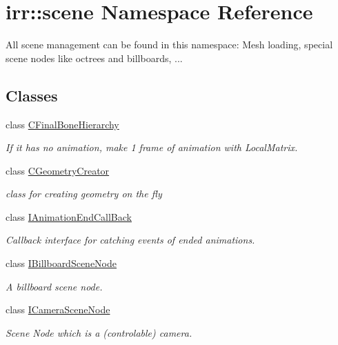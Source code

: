 \hypertarget{namespaceirr_1_1scene}{}\section{irr\+:\+:scene Namespace Reference}
\label{namespaceirr_1_1scene}


All scene management can be found in this namespace\+: Mesh loading, special scene nodes like octrees and billboards, ...  


\subsection*{Classes}
\begin{DoxyCompactItemize}
\item 
class \hyperlink{classirr_1_1scene_1_1CFinalBoneHierarchy}{C\+Final\+Bone\+Hierarchy}
\begin{DoxyCompactList}\small\item\em If it has no animation, make 1 frame of animation with Local\+Matrix. \end{DoxyCompactList}\item 
class \hyperlink{classirr_1_1scene_1_1CGeometryCreator}{C\+Geometry\+Creator}
\begin{DoxyCompactList}\small\item\em class for creating geometry on the fly \end{DoxyCompactList}\item 
class \hyperlink{classirr_1_1scene_1_1IAnimationEndCallBack}{I\+Animation\+End\+Call\+Back}
\begin{DoxyCompactList}\small\item\em Callback interface for catching events of ended animations. \end{DoxyCompactList}\item 
class \hyperlink{classirr_1_1scene_1_1IBillboardSceneNode}{I\+Billboard\+Scene\+Node}
\begin{DoxyCompactList}\small\item\em A billboard scene node. \end{DoxyCompactList}\item 
class \hyperlink{classirr_1_1scene_1_1ICameraSceneNode}{I\+Camera\+Scene\+Node}
\begin{DoxyCompactList}\small\item\em Scene Node which is a (controlable) camera. \end{DoxyCompactList}\item 

\end{DoxyCompactItemize}
